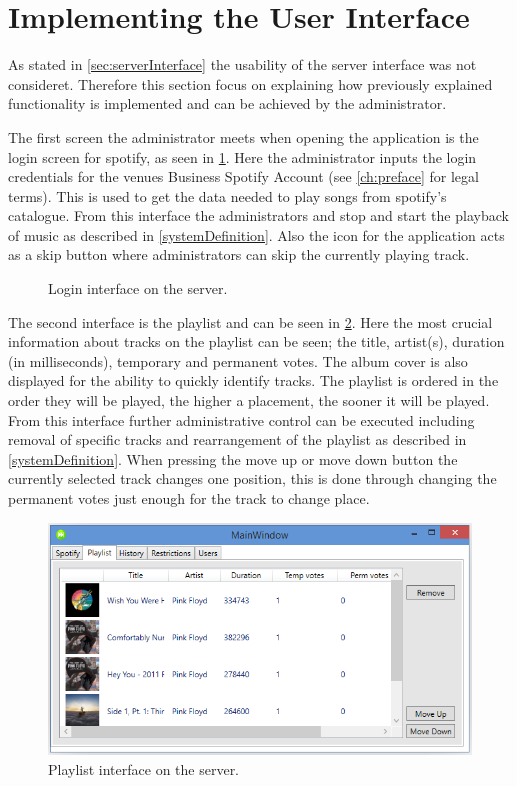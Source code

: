 \section{Implementing the User Interface}\label{sec:impinterface}
As stated in \cref{sec:serverInterface} the usability of the server interface was not consideret. Therefore this section focus on explaining how previously explained functionality is implemented and can be achieved by the administrator.

The first screen the administrator meets when opening the application is the login screen for spotify, as seen in \cref{fig:loginInterface}. Here the administrator inputs the login credentials for the venues Business Spotify Account (see \cref{ch:preface} for legal terms). This is used to get the data needed to play songs from spotify's catalogue. From this interface the administrators and stop and start the playback of music as described in \cref{systemDefinition}. Also the icon for the application acts as a skip button where administrators can skip the currently playing track.

\begin{figure}[H]\label{fig:loginInterface}
  \centering
  \caption{Login interface on the server.}
\end{figure}

The second interface is the playlist and can be seen in \cref{fig:ServerInterfacePlaylist}. Here the most crucial information about tracks on the playlist can be seen; the title, artist(s), duration (in milliseconds), temporary and permanent votes. The album cover is also displayed for the ability to quickly identify tracks. The playlist is ordered in the order they will be played, the higher a placement, the sooner it will be played. From this interface further administrative control can be executed including removal of specific tracks and rearrangement of the playlist as described in \cref{systemDefinition}. When pressing the move up or move down button the currently selected track changes one position, this is done through changing the permanent votes just enough for the track to change place.

\begin{figure}[hbtp]
  \centering
  \includegraphics[width=\textwidth]{Images/ServerInterfacePlaylist.png}
  \caption{Playlist interface on the server.}\label{fig:ServerInterfacePlaylist}
\end{figure}

